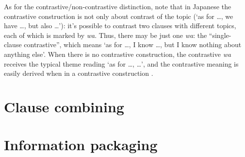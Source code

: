 \documentclass[UTF8, a4paper, oneside, scheme=plain]{ctexart}
\newcommand*{\citesec}[1]{\S~{#1}}
\newcommand{\corpus}[1]{\emph{#1}}
\newcommand{\translate}[1]{`#1'}
\begin{document}
As for the contrastive/non-contrastive distinction,
note that in Japanese the contrastive construction is not only about contrast of the topic 
(\translate{as for \dots, we have \dots, but also \dots}):
it's possible to contrast two clauses with different topics,
each of which is marked by \corpus{wa}.
Thus, there may be just one \corpus{wa}:
the ``single-clause contrastive'',
which means \translate{as for \dots, I know \dots, but I know nothing about anything else}.
When there is no contrastive construction,
the contrastive \corpus{wa} receives the typical theme reading 
\translate{as for \dots, \dots},
and the contrastive meaning is easily derived when in a contrastive construction
\citep[\citesec{3.4.2}]{heycock2008}.

\section{Clause combining}

\section{Information packaging}




\end{document}
